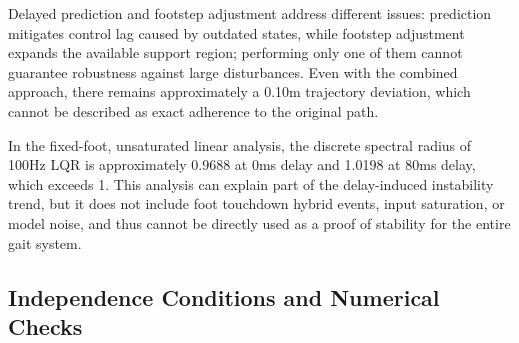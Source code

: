 Delayed prediction and footstep adjustment address different issues: prediction mitigates control lag caused by outdated states, while footstep adjustment expands the available support region; performing only one of them cannot guarantee robustness against large disturbances. Even with the combined approach, there remains approximately a 0.10m trajectory deviation, which cannot be described as exact adherence to the original path.

In the fixed-foot, unsaturated linear analysis, the discrete spectral radius of 100Hz LQR is approximately 0.9688 at 0ms delay and 1.0198 at 80ms delay, which exceeds 1. This analysis can explain part of the delay-induced instability trend, but it does not include foot touchdown hybrid events, input saturation, or model noise, and thus cannot be directly used as a proof of stability for the entire gait system.


\subsection{Independence Conditions and Numerical Checks}\label{s18-detail-3}

